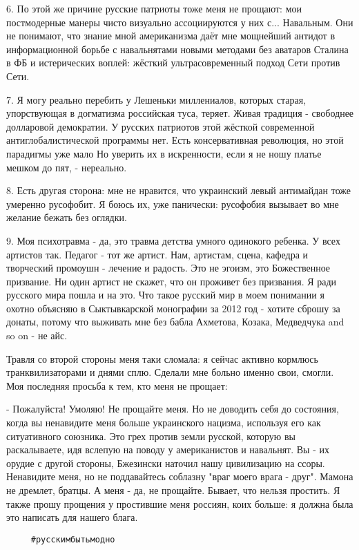 6. По этой же причине русские патриоты тоже меня не прощают: мои постмодерные
манеры чисто визуально ассоциируются у них с... Навальным. Они не понимают, что
знание мной американизма даёт мне мощнейший антидот в информационной борьбе с
навальнятами новыми методами без аватаров Сталина в ФБ и истерических воплей:
жёсткий ультрасовременный подход Сети против Сети. 

7. Я могу реально перебить у Лешеньки миллениалов, которых старая, упорствующая
в догматизма российская туса, теряет. Живая традиция - свободнее долларовой
демократии. У русских патриотов этой жёсткой современной антиглобалистической
программы нет. Есть консервативная революция, но этой парадигмы уже мало  Но
уверить их в искренности, если я не ношу платье мешком до пят, - нереально. 

8. Есть другая сторона: мне не нравится, что украинский левый антимайдан тоже
умеренно русофобит. Я боюсь их, уже панически: русофобия вызывает во мне
желание бежать без оглядки.

9. Моя психотравма - да, это травма детства умного одинокого ребенка. У всех
артистов так. Педагог - тот же артист. Нам, артистам, сцена, кафедра и
творческий промоушн - лечение и радость. Это не эгоизм, это Божественное
призвание. Ни один артист не скажет, что он проживет без призвания. Я ради
русского мира пошла и на это. Что такое русский мир в моем понимании я охотно
объясняю в Сыктывкарской монографии за 2012 год - хотите сброшу за донаты,
потому что выживать мне без бабла Ахметова, Козака, Медведчука and so on - не
айс.

Травля со второй стороны меня таки сломала: я сейчас активно кормлюсь
транквилизаторами и днями сплю. Сделали мне больно именно свои, смогли. Моя
последняя просьба к тем, кто меня не прощает:

- Пожалуйста! Умоляю! Не прощайте меня. Но не доводить себя до состояния, когда
вы ненавидите меня больше украинского нацизма, используя его как ситуативного
союзника. Это грех против земли русской, которую вы раскалываете, идя вслепую
на поводу у американистов и навальнят. Вы - их орудие с другой стороны,
Бжезински наточил нашу цивилизацию на ссоры. Ненавидите меня, но не
поддавайтесь соблазну "враг моего врага - друг". Мамона не дремлет, братцы. А
меня - да, не прощайте. Бывает, что нельзя простить. Я также прошу прощения у
простившие меня россиян, коих больше: я должна была это написать для нашего
блага.

\begin{verbatim}
	 #русскимбытьмодно
\end{verbatim}
